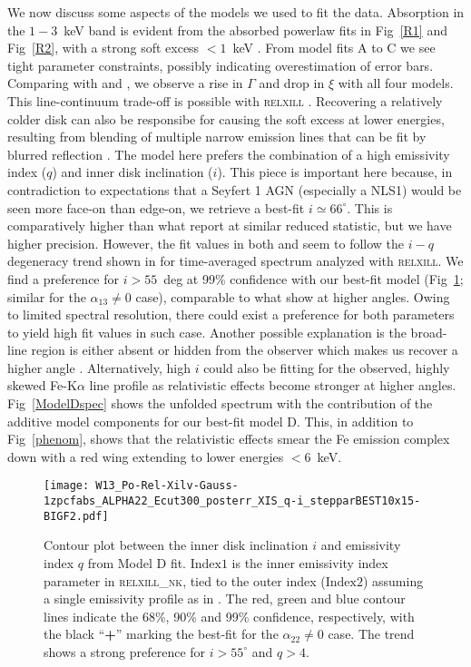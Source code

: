 \documentclass[aps,prd,twocolumn,superscriptaddress,nofootinbib,amsmath,amssymb]{revtex4-1}
\begin{document}
We now discuss some aspects of the models we used to fit the data. Absorption in the $1-3$~keV band is evident from the absorbed powerlaw fits in Fig~\ref{R1} and Fig~\ref{R2}, with a strong soft excess $<1$~keV \citep{Keek2016}. From model fits A to C we see tight parameter constraints, possibly indicating overestimation of error bars. Comparing with \cite{Patrick2011} and \cite{W13}, we observe a rise in $\Gamma$ and drop in $\xi$ with all four models. This line-continuum trade-off is possible with \textsc{relxill} \citep{K17}. Recovering a relatively colder disk can also be responsibe for causing the soft excess at lower energies, resulting from blending of multiple narrow emission lines that can be fit by blurred reflection \cite{Miller2007}. The model here prefers the combination of a high emissivity index ($q$) and inner disk inclination ($i$). This piece is important here because, in contradiction to expectations that a Seyfert 1 AGN (especially a NLS1) would be seen more face-on than edge-on, we retrieve a best-fit $i \simeq 66^\circ$. This is comparatively higher than what \cite{W13} report at similar reduced statistic, but we have higher precision. However, the fit values in both \cite{Patrick2011} and \cite{W13} seem to follow the $i-q$ degeneracy trend shown in \cite[Fig~11 therein]{Parker2014} for time-averaged spectrum analyzed with \textsc{relxill}. We find a preference for $i > 55$~deg at 99\% confidence with our best-fit model (Fig~\ref{i-q}; similar for the $\alpha_{13}\neq0$ case), comparable to what \cite{Parker2014} show at higher angles. Owing to limited spectral resolution, there could exist a preference for both parameters to yield high fit values in such case. Another possible explanation is the broad-line region is either absent or hidden from the observer which makes us recover a higher angle \citep{Giannuzzo1996}. Alternatively, high $i$ could also be fitting for the observed, highly skewed Fe-\textrm{K$\alpha$} line profile as relativistic effects become stronger at higher angles. Fig~\ref{ModelDspec} shows the unfolded spectrum with the contribution of the additive model components for our best-fit model D. This, in addition to Fig~\ref{phenom}, shows that the relativistic effects smear the Fe emission complex down with a red wing extending to lower energies $<6$~keV.

\begin{figure}[!t]
\centering
\texttt{[image: W13\_Po-Rel-Xilv-Gauss-1zpcfabs\_ALPHA22\_Ecut300\_posterr\_XIS\_q-i\_stepparBEST10x15-BIGF2.pdf]}
\caption{Contour plot between the inner disk inclination $i$ and emissivity index $q$ from Model D fit. $\textrm{Index1}$ is the inner emissivity index parameter in \textsc{relxill\_nk}, tied to the outer index ($\textrm{Index2}$) assuming a single emissivity profile as in \cite{W13}. The red, green and blue contour lines indicate the 68\%, 90\% and 99\% confidence, respectively, with the black ``\textbf{+}'' marking the best-fit for the $\alpha_{22}\neq0$ case. The trend shows a strong preference for $i>55^{\circ}$ and $q>4$.} \label{i-q}
\end{figure}
\end{document}
